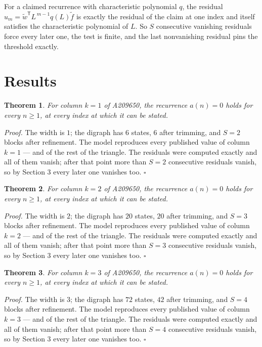 \documentclass[11pt]{article}
\newtheorem{theorem}{Theorem}
\theoremstyle{definition}
\begin{document}
For a claimed recurrence with characteristic polynomial $q$, the residual $u_m = \tilde w^{\mathsf T}L^{\,m-1}q(L)\tilde f$ is exactly the residual of the claim at one index and itself satisfies the characteristic polynomial of $L$. So $S$ consecutive vanishing residuals force every later one, the test is finite, and the last nonvanishing residual pins the threshold exactly.

\section{Results}

\begin{theorem} For column $k = 1$ of A209650, the recurrence $a(n) = 0$ holds for every $n \ge 1$, at every index at which it can be stated.\end{theorem}

{\itshape Proof.} The width is $1$; the digraph has $6$ states, $6$ after trimming, and $S = 2$ blocks after refinement. The model reproduces every published value of column $k = 1$ --- and of the rest of the triangle. The residuals were computed exactly and all of them vanish; after that point more than $S = 2$ consecutive residuals vanish, so by Section 3 every later one vanishes too. $\square$

\begin{theorem} For column $k = 2$ of A209650, the recurrence $a(n) = 0$ holds for every $n \ge 1$, at every index at which it can be stated.\end{theorem}

{\itshape Proof.} The width is $2$; the digraph has $20$ states, $20$ after trimming, and $S = 3$ blocks after refinement. The model reproduces every published value of column $k = 2$ --- and of the rest of the triangle. The residuals were computed exactly and all of them vanish; after that point more than $S = 3$ consecutive residuals vanish, so by Section 3 every later one vanishes too. $\square$

\begin{theorem} For column $k = 3$ of A209650, the recurrence $a(n) = 0$ holds for every $n \ge 1$, at every index at which it can be stated.\end{theorem}

{\itshape Proof.} The width is $3$; the digraph has $72$ states, $42$ after trimming, and $S = 4$ blocks after refinement. The model reproduces every published value of column $k = 3$ --- and of the rest of the triangle. The residuals were computed exactly and all of them vanish; after that point more than $S = 4$ consecutive residuals vanish, so by Section 3 every later one vanishes too. $\square$
\end{document}
